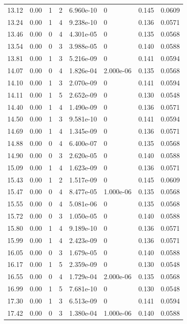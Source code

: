 \documentclass[preview]{standalone}
\begin{document}
{{{\begin{tabular}{L{1.2cm}C{1.2cm} C{0.3cm}C{0.5cm} C{1.4cm}C{1.4cm} C{1.4cm}C{1.4cm}}
  13.12  &  0.00  & 1     &  2 &  6.960e-10  & 0  & 0.145 &  0.0609   \\ 
  13.24  &  0.00  & 1     &  4 &  9.238e-10  & 0  & 0.136 &  0.0571   \\ 
  13.46  &  0.00  & 0     &  4 &  4.301e-05  & 0  & 0.135 &  0.0568   \\ 
  13.54  &  0.00  & 0     &  3 &  3.988e-05  & 0  & 0.140 &  0.0588   \\ 
  13.81  &  0.00  & 1     &  3 &  5.216e-09  & 0  & 0.141 &  0.0594   \\ 
  14.07  &  0.00  & 0     &  4 &  1.826e-04  & 2.000e-06  & 0.135 &  0.0568   \\ 
  14.10  &  0.00  & 1     &  3 &  2.070e-09  & 0  & 0.141 &  0.0594   \\ 
  14.11  &  0.00  & 1     &  5 &  2.652e-09  & 0  & 0.130 &  0.0548   \\ 
  14.40  &  0.00  & 1     &  4 &  1.490e-09  & 0  & 0.136 &  0.0571   \\ 
  14.50  &  0.00  & 1     &  3 &  9.581e-10  & 0  & 0.141 &  0.0594   \\ 
  14.69  &  0.00  & 1     &  4 &  1.345e-09  & 0  & 0.136 &  0.0571   \\ 
  14.88  &  0.00  & 0     &  4 &  6.400e-07  & 0  & 0.135 &  0.0568   \\ 
  14.90  &  0.00  & 0     &  3 &  2.620e-05  & 0  & 0.140 &  0.0588   \\ 
  15.09  &  0.00  & 1     &  4 &  1.623e-09  & 0  & 0.136 &  0.0571   \\ 
  15.43  &  0.00  & 1     &  2 &  1.517e-09  & 0  & 0.145 &  0.0609   \\ 
  15.47  &  0.00  & 0     &  4 &  8.477e-05  & 1.000e-06  & 0.135 &  0.0568   \\ 
  15.55  &  0.00  & 0     &  4 &  5.081e-06  & 0  & 0.135 &  0.0568   \\ 
  15.72  &  0.00  & 0     &  3 &  1.050e-05  & 0  & 0.140 &  0.0588   \\ 
  15.80  &  0.00  & 1     &  4 &  9.189e-10  & 0  & 0.136 &  0.0571   \\ 
  15.99  &  0.00  & 1     &  4 &  2.423e-09  & 0  & 0.136 &  0.0571   \\ 
  16.05  &  0.00  & 0     &  3 &  1.679e-05  & 0  & 0.140 &  0.0588   \\ 
  16.17  &  0.00  & 1     &  5 &  2.359e-09  & 0  & 0.130 &  0.0548   \\ 
  16.55  &  0.00  & 0     &  4 &  1.729e-04  & 2.000e-06  & 0.135 &  0.0568   \\ 
  16.99  &  0.00  & 1     &  5 &  7.681e-10  & 0  & 0.130 &  0.0548   \\ 
  17.30  &  0.00  & 1     &  3 &  6.513e-09  & 0  & 0.141 &  0.0594   \\ 
  17.42  &  0.00  & 0     &  3 &  1.380e-04  & 1.000e-06  & 0.140 &  0.0588   \\ 
\hline 
\end{tabular} 

}}}
\end{document}
